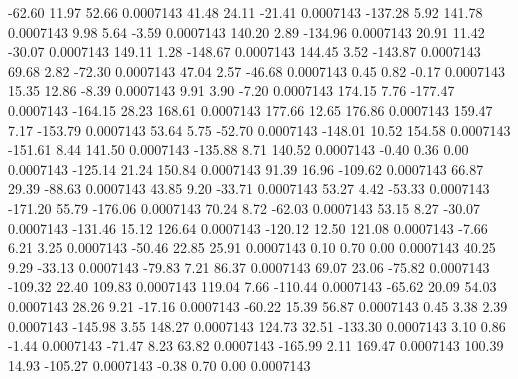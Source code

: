       -62.60       11.97       52.66     0.0007143
       41.48       24.11      -21.41     0.0007143
     -137.28        5.92      141.78     0.0007143
        9.98        5.64       -3.59     0.0007143
      140.20        2.89     -134.96     0.0007143
       20.91       11.42      -30.07     0.0007143
      149.11        1.28     -148.67     0.0007143
      144.45        3.52     -143.87     0.0007143
       69.68        2.82      -72.30     0.0007143
       47.04        2.57      -46.68     0.0007143
        0.45        0.82       -0.17     0.0007143
       15.35       12.86       -8.39     0.0007143
        9.91        3.90       -7.20     0.0007143
      174.15        7.76     -177.47     0.0007143
     -164.15       28.23      168.61     0.0007143
      177.66       12.65      176.86     0.0007143
      159.47        7.17     -153.79     0.0007143
       53.64        5.75      -52.70     0.0007143
     -148.01       10.52      154.58     0.0007143
     -151.61        8.44      141.50     0.0007143
     -135.88        8.71      140.52     0.0007143
       -0.40        0.36        0.00     0.0007143
     -125.14       21.24      150.84     0.0007143
       91.39       16.96     -109.62     0.0007143
       66.87       29.39      -88.63     0.0007143
       43.85        9.20      -33.71     0.0007143
       53.27        4.42      -53.33     0.0007143
     -171.20       55.79     -176.06     0.0007143
       70.24        8.72      -62.03     0.0007143
       53.15        8.27      -30.07     0.0007143
     -131.46       15.12      126.64     0.0007143
     -120.12       12.50      121.08     0.0007143
       -7.66        6.21        3.25     0.0007143
      -50.46       22.85       25.91     0.0007143
        0.10        0.70        0.00     0.0007143
       40.25        9.29      -33.13     0.0007143
      -79.83        7.21       86.37     0.0007143
       69.07       23.06      -75.82     0.0007143
     -109.32       22.40      109.83     0.0007143
      119.04        7.66     -110.44     0.0007143
      -65.62       20.09       54.03     0.0007143
       28.26        9.21      -17.16     0.0007143
      -60.22       15.39       56.87     0.0007143
        0.45        3.38        2.39     0.0007143
     -145.98        3.55      148.27     0.0007143
      124.73       32.51     -133.30     0.0007143
        3.10        0.86       -1.44     0.0007143
      -71.47        8.23       63.82     0.0007143
     -165.99        2.11      169.47     0.0007143
      100.39       14.93     -105.27     0.0007143
       -0.38        0.70        0.00     0.0007143
